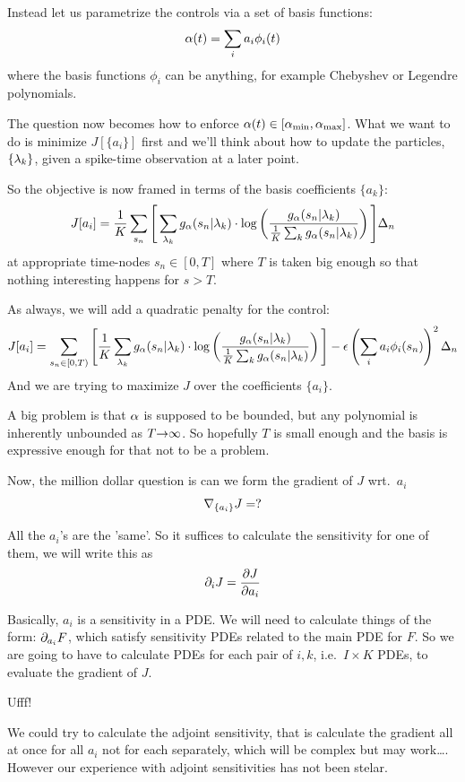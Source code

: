 \documentclass{article}
\begin{document}
Instead let us parametrize the controls via a set of basis functions:
$$
{\alpha}(t) = \sum_i a_i \phi_i(t)
$$
where the basis functions $\phi_i$ can be anything, for example Chebyshev or
Legendre polynomials.

The question now becomes how to enforce ${\alpha}(t) \in [{ {\alpha}_{\textrm{min}} }, { {\alpha}_{\textrm{max}} }]$.
What we want to do is minimize $J[\{a_i\}]$ first and we'll think about how to
update the  particles, $\{{\lambda}_k\}$, given a spike-time observation at a later
point.

So the objective is now framed in terms of the basis coefficients $\{a_k\}$:
$$J[a_i] =
\frac 1K
\sum_{s_n}
    \Bigg[\sum_{{\lambda}_k} g_{\alpha}(s_n | {\lambda}_k) \cdot 
			 			   \log\left(\frac{g_{\alpha}(s_n | {\lambda}_k)}
			 			   			      {\tfrac 1K \sum_k  g_{\alpha}(s_n | {\lambda}_k) } \right)
					  \Bigg] \Delta_n
$$
at appropriate time-nodes $s_n \in [0, T]$ where $T$ is taken big enough so that
nothing interesting happens for $s > T$.

As always, we will add a quadratic penalty for the control:
\begin{equation}
J[a_i] =
\sum_{s_n \in [0,T)}
    \Bigg[\frac 1K\sum_{{\lambda}_k} g_{\alpha}(s_n | {\lambda}_k)  \cdot 
			 			   \log\left(\frac{g_{\alpha}(s_n | {\lambda}_k)}
			 			   			      {\tfrac 1K \sum_k  g_{\alpha}(s_n | {\lambda}_k) } \right)\Bigg]
					    - {\epsilon} \left( \sum_i a_i \phi_i(s_n) \right)^2 
					   \Delta_n
\label{eq:J__particles_KL_discretized}
\end{equation}
And we are trying to maximize $J$ over the coefficients $\{a_i\}$.

A big problem is that ${\alpha}$ is supposed to be bounded, but any polynomial is
inherently unbounded as $T {\rightarrow} \infty$. So hopefully $T$ is small enough and
the basis is expressive enough for that not to be a problem. 

Now, the million dollar question is can we form the gradient of $J$ wrt.\ $a_i$
$$
{ \nabla }_{\{a_i\}}J = ? 
$$

All the $a_i$'s are the 'same'. So it suffices to calculate the sensitivity for
one of them, we will write this as 
$$
{\partial}_i J = \frac{{\partial} J}{{\partial} a_i}
$$

Basically, $a_i$ is a sensitivity in a PDE. We will need to calculate things of
the form: ${\partial}_{a_i}F$, which satisfy sensitivity PDEs related to the main PDE
for $F$. So we are going to have to calculate PDEs for each pair
of $i,k$, i.e.\ $I\times K$ PDEs, to evaluate the gradient of $J$.

Ufff!

We could try to calculate the adjoint sensitivity, that is calculate the
gradient all at once for all $a_i$ not for each separately, which will be
complex but may work\ldots. However our experience with adjoint sensitivities
has not been stelar. 
\end{document}
